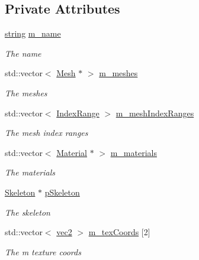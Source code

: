 \subsection*{Private Attributes}
\begin{DoxyCompactItemize}
\item 
\hyperlink{_types_8h_ad453f9f71ce1f9153fb748d6bb25e454}{string} \hyperlink{class_model_a862ab593f7a9e07ed55fd734b7ea6abd}{m\+\_\+name}
\begin{DoxyCompactList}\small\item\em The name \end{DoxyCompactList}\item 
std\+::vector$<$ \hyperlink{class_mesh}{Mesh} $\ast$ $>$ \hyperlink{class_model_a2f3d6af54716219364db7bc87e231e3b}{m\+\_\+meshes}
\begin{DoxyCompactList}\small\item\em The meshes \end{DoxyCompactList}\item 
std\+::vector$<$ \hyperlink{struct_index_range}{Index\+Range} $>$ \hyperlink{class_model_a1f36d8e62aa0375e25255f6e0f8bc5c5}{m\+\_\+mesh\+Index\+Ranges}
\begin{DoxyCompactList}\small\item\em The mesh index ranges \end{DoxyCompactList}\item 
std\+::vector$<$ \hyperlink{class_material}{Material} $\ast$ $>$ \hyperlink{class_model_a17953e88c3232c1d1e4394f7412eb8ef}{m\+\_\+materials}
\begin{DoxyCompactList}\small\item\em The materials \end{DoxyCompactList}\item 
\hyperlink{class_skeleton}{Skeleton} $\ast$ \hyperlink{class_model_a2318827a9c98ccd63bfbbb0f3ac84b8a}{p\+Skeleton}
\begin{DoxyCompactList}\small\item\em The skeleton \end{DoxyCompactList}\item 
std\+::vector$<$ \hyperlink{_types_8h_a43182e59794291f6ab00e51b160706c2}{vec2} $>$ \hyperlink{class_model_acfac7d57325506a10c5ce88a01d97084}{m\+\_\+tex\+Coords} \mbox{[}2\mbox{]}
\begin{DoxyCompactList}\small\item\em The m texture coords \end{DoxyCompactList}\item 

\end{DoxyCompactItemize}
